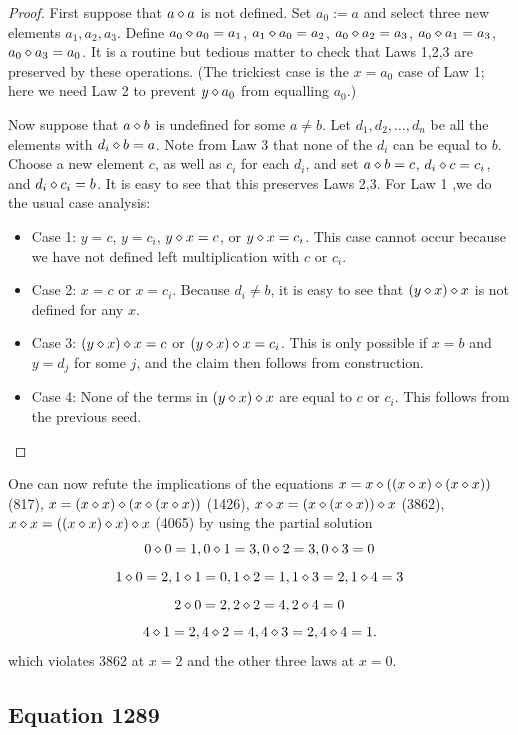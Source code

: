 \begin{proof}  First suppose that $a \diamond a$ is not defined.  Set $a_0 := a$ and select three new elements $a_1,a_2,a_3$.  Define $a_0 \diamond a_0 = a_1$, $a_1 \diamond a_0 = a_2$, $a_0 \diamond a_2 = a_3$, $a_0 \diamond a_1 = a_3$, $a_0 \diamond a_3 = a_0$.  It is a routine but tedious matter to check that Laws 1,2,3 are preserved by these operations.  (The trickiest case is the $x=a_0$ case of Law 1; here we need Law 2 to prevent $y \diamond a_0$ from equalling $a_0$.)

Now suppose that $a \diamond b$ is undefined for some $a \neq b$.  Let $d_1,d_2,\dots,d_n$ be all the elements with $d_i \diamond b = a$.  Note from Law 3 that none of the $d_i$ can be equal to $b$.  Choose a new element $c$, as well as $c_i$ for each $d_i$, and set $a \diamond b = c$, $d_i \diamond c = c_i$, and $d_i \diamond c_i = b$.  It is easy to see that this preserves Laws 2,3.  For Law 1 ,we do the usual case analysis:
\begin{itemize}
\item Case 1: $y = c$, $y = c_i$, $y \diamond x = c$, or $y \diamond x = c_i$.  This case cannot occur because we have not defined left multiplication with $c$ or $c_i$.
\item Case 2: $x = c$ or $x = c_i$.  Because $d_i \neq b$, it is easy to see that $(y \diamond x) \diamond x$ is not defined for any $x$.
\item Case 3: $(y \diamond x) \diamond x = c$ or $(y \diamond x) \diamond x = c_i$.  This is only possible if $x=b$ and $y = d_j$ for some $j$, and the claim then follows from construction.
\item Case 4: None of the terms in $(y \diamond x) \diamond x$ are equal to $c$ or $c_i$.  This follows from the previous seed.
\end{itemize}
\end{proof}

One can now refute the implications of the equations $x = x \diamond ((x \diamond x) \diamond (x \diamond x))$ (817), $x = (x \diamond x) \diamond (x \diamond (x \diamond x))$ (1426), $x \diamond x = (x \diamond (x \diamond x)) \diamond x$ (3862), $x \diamond x = ((x \diamond x) \diamond x) \diamond x$ (4065) by using the partial solution
$$ 0 \diamond 0 = 1, 0 \diamond 1 = 3, 0 \diamond 2 = 3, 0 \diamond 3 = 0$$
$$1\diamond 0 = 2, 1 \diamond 1 = 0, 1 \diamond 2 = 1, 1 \diamond 3 =2 , 1 \diamond 4 = 3$$
$$ 2 \diamond 0 = 2, 2 \diamond 2 = 4, 2 \diamond 4 = 0$$
$$ 4 \diamond 1 = 2, 4 \diamond 2 = 4, 4 \diamond 3 = 2, 4 \diamond 4 = 1.$$
which violates 3862 at $x=2$ and the other three laws at $x=0.$

\subsection{Equation 1289}

